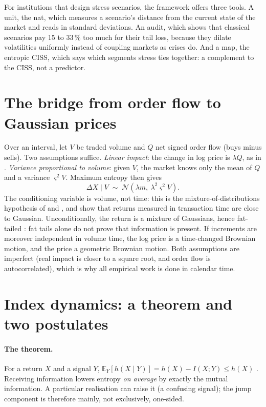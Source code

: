 \documentclass[11pt]{article}
\theoremstyle{definition}
\begin{document}
For institutions that design stress scenarios, the framework offers three
tools. A unit, the nat, which measures a scenario's distance from the current
state of the market and reads in standard deviations. An audit, which shows
that classical scenarios pay $15$ to $33\,\%$ too much for their tail loss,
because they dilate volatilities uniformly instead of coupling markets as
crises do. And a map, the entropic CISS, which says which segments stress ties
together: a complement to the CISS, not a predictor.

\appendix

\section{The bridge from order flow to Gaussian prices}
\label{app:pont}

Over an interval, let $V$ be traded volume and $Q$ net signed order flow (buys
minus sells). Two assumptions suffice. \emph{Linear impact}: the change in log
price is $\lambda Q$, as in \citet{kyle1985}. \emph{Variance proportional to
volume}: given $V$, the market knows only the mean of $Q$ and a variance
$\varsigma^2V$. Maximum entropy then gives
\begin{equation}
\Delta X \mid V \;\sim\; \mathcal N\!\left(\lambda m,\ \lambda^2\varsigma^2 V\right).
\end{equation}
The conditioning variable is volume, not time: this is the
mixture-of-distributions hypothesis of \citet{clark1973} and
\citet{tauchen1983}, and \citet{ane2000} show that returns measured in
transaction time are close to Gaussian. Unconditionally, the return is a
mixture of Gaussians, hence fat-tailed \citep{mandelbrot1967}: fat tails alone
do not prove that information is present. If increments are moreover
independent in volume time, the log price is a time-changed Brownian motion,
and the price a geometric Brownian motion. Both assumptions are imperfect
(real impact is closer to a square root, and order flow is autocorrelated),
which is why all empirical work is done in calendar time.

\section{Index dynamics: a theorem and two postulates}
\label{app:dynamique}

\paragraph{The theorem.} For a return $X$ and a signal $Y$,
$\mathbb{E}_Y[h(X\mid Y)]=h(X)-I(X;Y)\le h(X)$ \citep{cover2006}. Receiving
information lowers entropy \emph{on average} by exactly the mutual
information. A particular realisation can raise it (a confusing signal); the
jump component is therefore mainly, not exclusively, one-sided.
\end{document}
